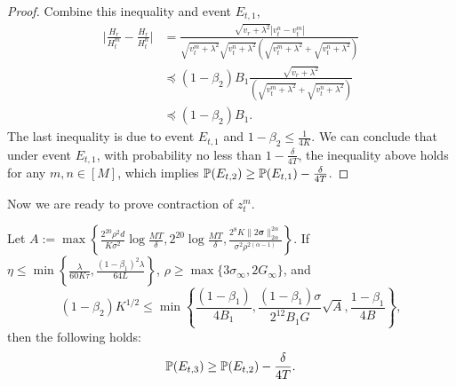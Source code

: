 \documentclass{article} %
\numberwithin{equation}{section}
\begin{document}
\begin{proof}
    Combine this inequality and event $E_{t,1}$,
    \begin{equation}
        \begin{aligned}
            \bigg| \frac{H_r}{H_t^m}-\frac{H_r}{H_t^n} \bigg|
            &= \frac{\sqrt{v_r+\lambda^2}|v_t^n-v_t^m|}{\sqrt{v_t^m+\lambda^2}\sqrt{v_t^n+\lambda^2}(\sqrt{v_t^m+\lambda^2}+\sqrt{v_t^n+\lambda^2})} \\
            &\preceq (1-\beta_2)B_1\frac{\sqrt{v_r+\lambda^2}}{(\sqrt{v_t^m+\lambda^2}+\sqrt{v_t^n+\lambda^2})} \\
            &\preceq (1-\beta_2)B_1.
        \end{aligned}
    \end{equation}
    The last inequality is due to event $E_{t,1}$ and $1-\beta_2\leq \frac{1}{4K}$.
    We can conclude that under event $E_{t,1}$, with probability no less than $1-\frac{\delta}{4T}$, the inequality above holds for any $m,n \in [M]$, which implies $\mathbb{P}(E_{t,2})\geq \mathbb{P}(E_{t,1})-\frac{\delta}{4T}$.
\end{proof}

    Now we are ready to prove contraction of $z_t^m$.

\begin{lemma}\label{lem:contraction}
    Let $A:=\max\left\{\frac{2^{20}\rho^2d}{K\sigma^2}\log\frac{MT}{\delta}, 2^{20}\log\frac{MT}{\delta}, \frac{2^8K\|2\boldsymbol{\sigma}\|_{2\alpha}^{2\alpha}}{\sigma^2\rho^{2(\alpha-1)}} \right\}$. 
    If $\eta\leq \min\left\{ \frac{\lambda}{60K\tau}, \frac{(1-\beta_1)^2\lambda}{64L}\right\}$, $\rho\geq \max\{3\sigma_\infty, 2G_\infty\}$, and
    \begin{equation}
        (1-\beta_2)K^{1/2}\leq \min\left\{\frac{(1-\beta_1)}{4B_1}, \frac{(1-\beta_1)\sigma}{2^{12}B_1G}\sqrt{A}, \frac{1-\beta_1}{4B} \right\},
    \end{equation}
    then the following holds:
    \begin{equation}
        \mathbb{P} (E_{t,3})\geq \mathbb{P}(E_{t,2})-\frac{\delta}{4T}.
    \end{equation}
\end{lemma}
\end{document}
